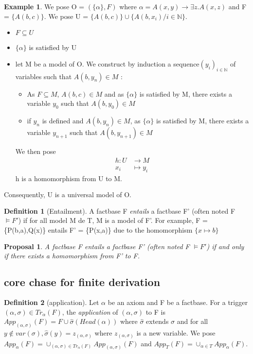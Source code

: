 \documentclass{article}
\theoremstyle{proposal}
\newtheorem{proposal}{Proposal}[section]
\theoremstyle{definition}
\newtheorem{definition}{Definition}[section]
\theoremstyle{theorem}
\theoremstyle{example}
\newtheorem{example}{Example}[section]
\theoremstyle{remark}
\def \N {\mathbb N}
\begin{document}
\begin{example} We pose O = $(\{\alpha\},F)$ where $\alpha = A(x,y) \rightarrow \exists z.A(x,z)$ and F = $\{A(b,c)\}$. We pose U = $\{A(b,c)\}\cup \{A(b,x_i)/ i \in \N\}$.
\begin{itemize}
\item $F \subseteq U$
\item $\{\alpha\}$ is satisfied by U
\item let M be a model of O. We construct by induction a sequence$(y_i)_{i \in \N}$ of variables such that $A(b,y_n) \in M$ : 
\begin{itemize}
\item As $F \subseteq M$, $A(b,c) \in M$ and as $\{\alpha\}$ is satisfied by M, there exists a variable $y_0$ such that $A(b,y_0) \in M$
\item if $y_n$ is defined and $A(b,y_n) \in M$, as $\{\alpha\}$ is satisfied by M, there exists a variable $y_{n+1}$ such that $A(b,y_{n+1}) \in M$
\end{itemize}
We then pose 
\begin{align*}
h:U &\to M\\
x_i &\mapsto y_i
\end{align*}
h is a homomorphism from U to M.
\end{itemize}
Consequently, U is a universal model of O.
\end{example}

\begin{definition}[Entailment]
A factbase F \emph{entails} a factbase F' (often noted F $\models F'$) if for all model M de T, M is a model of F'. For example, F = \{P(b,a),Q(x)\} entails F' = \{P(x,a)\} due to the homomorphism $\{x \mapsto b\}$ 
\end{definition}

\begin{proposal}
A factbase F \emph{entails} a factbase F' (often noted F $\models F'$) if and only if there exists a homomorphism from F' to F.
\end{proposal}

\subsection{core chase for finite derivation}

\begin{definition}[application]
Let $\alpha$ be an axiom and F be a factbase. For a trigger $(\alpha,\sigma) \in Tr_\alpha(F)$, the \emph{application} of $(\alpha,\sigma)$ to F is $App_{(\alpha,\sigma)}(F) = F\cup \hat \sigma(Head(\alpha))$ where $\hat \sigma$ extends $\sigma$ and for all $y \notin var(\sigma), \hat \sigma(y) = z_{(\alpha,\sigma)}$ where $z_{(\alpha,\sigma)}$ is a new variable. We pose $App_{\alpha}(F) = \cup_{(\alpha,\sigma) \in Tr_\alpha(F)}App_{(\alpha,\sigma)}(F)$ and $App_{T}(F) = \cup_{\alpha \in T}App_{\alpha}(F)$.

\end{definition} 
\end{document}
